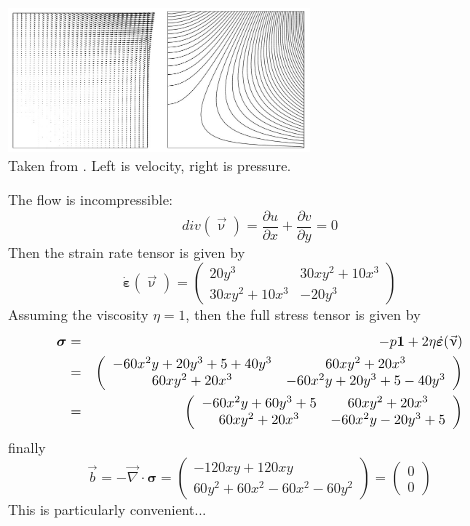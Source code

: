 \begin{center}
\includegraphics[width=8cm]{images/mms/buha06}\\
{\captionfont Taken from \textcite{buha06}. Left is velocity, right is pressure.}
\end{center}

The flow is incompressible:
\[
div (\vec\upnu) = 
\frac{\partial u }{\partial x}
+
\frac{\partial v }{\partial y}
= 0
\]
Then the strain rate tensor is given by 
\[
\dot{\bm\varepsilon} (\vec\upnu)
=
\left(
\begin{array}{cc}
20y^3 & 30xy^2+10x^3 \\
30xy^2+10x^3 & -20y^3
\end{array}
\right)
\]
Assuming the viscosity $\eta=1$, then the full stress tensor is 
given by
\begin{eqnarray}
{\bm\sigma} 
&=& -p {\bm 1} + 2 \eta \dot{\bm\varepsilon} (\vec\upnu) \nonumber\\
&=&
\left(
\begin{array}{cc}
-60x^2y +20y^3 +5 + 40y^3 & 60xy^2+20x^3 \\
60xy^2+20x^3 & -60x^2y +20y^3 +5 -40y^3
\end{array}
\right) \nonumber\\
&=&
\left(
\begin{array}{cc}
-60x^2y +60y^3 +5  & 60xy^2+20x^3 \\
60xy^2+20x^3 & -60x^2y -20y^3 +5 
\end{array}
\right)
\end{eqnarray}
finally 
\[
\vec{b} 
= -\vec\nabla\cdot \bm\sigma
= 
\left(
\begin{array}{c}
-120xy + 120xy \\
60y^2 + 60x^2 -60x^2 -60y^2
\end{array}
\right)
=
\left(
\begin{array}{c}
0 \\
0
\end{array}
\right)
\]
This is particularly convenient...


